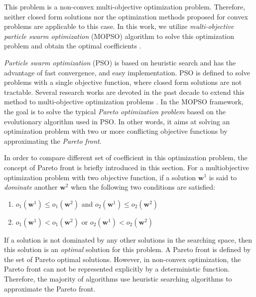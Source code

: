 This problem is a non-convex multi-objective optimization problem. Therefore, neither closed form solutions nor the optimization methods proposed for convex problems are applicable to this case. In this work, we utilize \textit{multi-objective particle swarm optimization} (MOPSO) algorithm to solve this optimization problem and obtain the optimal coefficients \cite{coello2002mopso}.

\textit{Particle swarm optimization} (PSO) is based on heuristic search and has the advantage of fast convergence, and easy implementation\cite{coello2002mopso, alvarez2005mopso}. PSO is defined to solve problems with a single objective function, where closed form solutions are not tractable.  Several research works are devoted in the past decade to extend this method to multi-objective optimization problems \cite{sierra2005improving, coello2005recent}. In the MOPSO framework, the goal is to solve the typical \textit{Pareto optimization problem} based on the evolutionary algorithm used in PSO. In other words, it aims at solving an optimization problem with two or more conflicting objective functions by approximating the \textit{Pareto front}. 


In order to compare different set of coefficient in this optimization problem, the concept of Pareto front is briefly introduced in this section. For a multiobjective optimization problem with two objective function, if a solution $\mathbf{w}^1$ is said to \textit{dominate} another $\mathbf{w}^2$ when the following two conditions are satisfied:
\begin{enumerate}
    \item $o_1(\mathbf{w}^1) \leq  o_1(\mathbf{w}^2)$ and $o_2(\mathbf{w}^1) \leq  o_2(\mathbf{w}^2)$ 
    \item $o_1(\mathbf{w}^1) <  o_1(\mathbf{w}^2)$ or $o_2(\mathbf{w}^1) < o_2(\mathbf{w}^2)$ 
\end{enumerate}

If a solution is not dominated by any other solutions in the searching space, then this solution is an \textit{optimal} solution for this problem. A Pareto front is defined by the set of Pareto optimal solutions. However, in non-convex optimization, the Pareto front can not be represented explicitly by a deterministic function. Therefore, the majority of algorithms use heuristic searching algorithms to approximate the Pareto front\cite{coello2002mopso}.

